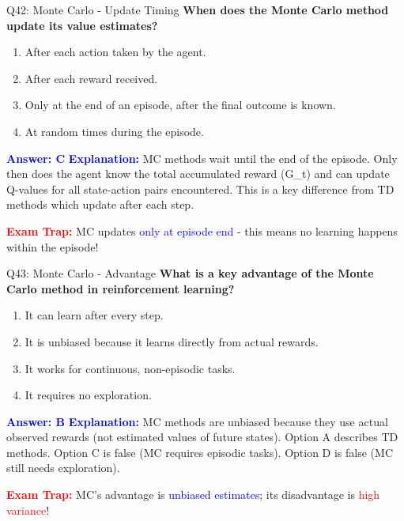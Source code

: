 \documentclass[8pt]{beamer}
\begin{document}
	\begin{frame}{Q42: Monte Carlo - Update Timing}
		\fontsize{6.5}{7.5}\selectfont
		\textbf{When does the Monte Carlo method update its value estimates?}
		
		\begin{enumerate}
			\item After each action taken by the agent.
			\item After each reward received.
			\item Only at the end of an episode, after the final outcome is known.
			\item At random times during the episode.
		\end{enumerate}
		
		\vspace{0.1cm}
		\textcolor{blue}{\textbf{Answer: C}}
		\vspace{0.1cm}
		\textcolor{blue}{\textbf{Explanation:}} MC methods wait until the end of the episode. Only then does the agent know the total accumulated reward (G\_t) and can update Q-values for all state-action pairs encountered. This is a key difference from TD methods which update after each step.
		
		\textcolor{red}{\textbf{Exam Trap:}} MC updates \textcolor{blue}{only at episode end} - this means no learning happens within the episode!
	\end{frame}
	
	\begin{frame}{Q43: Monte Carlo - Advantage}
		\fontsize{6.5}{7.5}\selectfont
		\textbf{What is a key advantage of the Monte Carlo method in reinforcement learning?}
		
		\begin{enumerate}
			\item It can learn after every step.
			\item It is unbiased because it learns directly from actual rewards.
			\item It works for continuous, non-episodic tasks.
			\item It requires no exploration.
		\end{enumerate}
		
		\vspace{0.1cm}
		\textcolor{blue}{\textbf{Answer: B}}
		\vspace{0.1cm}
		\textcolor{blue}{\textbf{Explanation:}} MC methods are unbiased because they use actual observed rewards (not estimated values of future states). Option A describes TD methods. Option C is false (MC requires episodic tasks). Option D is false (MC still needs exploration).
		
		\textcolor{red}{\textbf{Exam Trap:}} MC's advantage is \textcolor{blue}{unbiased estimates}; its disadvantage is \textcolor{red}{high variance}!
	\end{frame}
	
\end{document}
